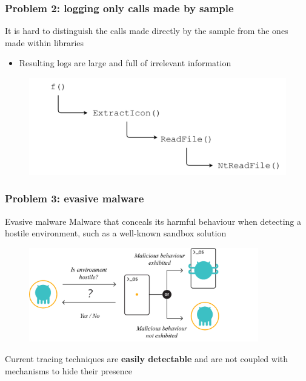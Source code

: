 \documentclass[compress]{beamer}
\begin{document}
\begin{frame}[fragile]
    \frametitle{Problem 2: logging only calls made by sample}

It is hard to distinguish the calls made directly by the sample from the ones made within libraries
\begin{itemize}
\item Resulting logs are large and full of irrelevant information
\end{itemize}

    \begin{figure}
    	\vspace{-0.2cm}
    	\hspace*{-1cm}
        \includegraphics[width=12cm]{image/MainImage1.pdf}
    \end{figure}

\end{frame}

\begin{frame}[fragile]
    \frametitle{Problem 3: evasive malware}
    
     \begin{beamerboxesrounded}[shadow=true]{Evasive malware}
Malware that conceals its harmful behaviour when detecting a
hostile environment, such as a well-known sandbox
solution
    \end{beamerboxesrounded}
    \bigskip
    \bigskip
    \begin{figure}
    	\vspace{-0.8cm}
    	\hspace*{0.5cm}
        \includegraphics[width=10cm]{image/evasive.pdf}
    \end{figure}
\vspace{-0.3cm}
Current tracing techniques are \textbf{easily detectable} and are not coupled with mechanisms to hide their presence

\end{frame}
\end{document}
